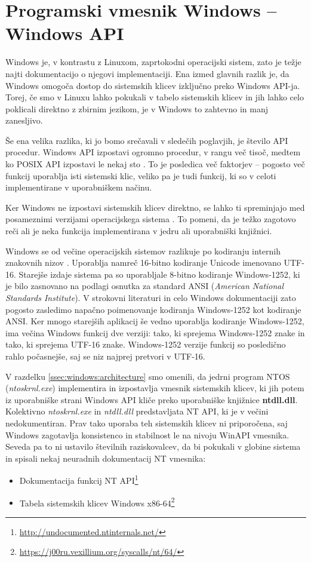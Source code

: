 \documentclass[a4paper,12pt,openright]{book}
\begin{document}
\section{Programski vmesnik Windows -- Windows API} \label{sec:windows_api}

Windows je, v kontrastu z Linuxom, zaprtokodni operacijski sistem, zato je težje najti dokumentacijo o njegovi implementaciji.
Ena izmed glavnih razlik je, da Windows omogoča dostop do sistemskih klicev izključno preko Windows API-ja.
Torej, če smo v Linuxu lahko pokukali v tabelo sistemskih klicev in jih lahko celo poklicali direktno z zbirnim jezikom, je v Windows to zahtevno in manj zanesljivo.

Še ena velika razlika, ki jo bomo srečavali v sledečih poglavjih, je število API procedur.
Windows API izpostavi ogromno procedur, v rangu več tisoč, medtem ko POSIX API izpostavi le nekaj sto \cite{Tanenbaum_Bos_2023}.
To je posledica več faktorjev -- pogosto več funkcij uporablja isti sistemski klic, veliko pa je tudi funkcij, ki so v celoti implementirane v uporabniškem načinu.

Ker Windows ne izpostavi sistemskih klicev direktno, se lahko ti spreminjajo med posameznimi verzijami operacijskega sistema \cite{Tanenbaum_Bos_2023}.
To pomeni, da je težko zagotovo reči ali je neka funkcija implementirana v jedru ali uporabniški knjižnici.

Windows se od večine operacijskih sistemov razlikuje po kodiranju internih znakovnih nizov \cite{Yosifovich_Russinovich_Solomon_Ionescu_2017}.
Uporablja namreč 16-bitno kodiranje Unicode imenovano UTF-16.
Starejše izdaje sistema pa so uporabljale 8-bitno kodiranje Windows-1252, ki je bilo zasnovano na podlagi osnutka za standard ANSI (\textit{American National Standards Institute}).
V strokovni literaturi in celo Windows dokumentaciji zato pogosto zasledimo napačno poimenovanje kodiranja Windows-1252 kot kodiranje ANSI.
Ker mnogo starejših aplikacij še vedno uporablja kodiranje Windows-1252, ima večina Windows funkcij dve verziji: tako, ki sprejema Windows-1252 znake in tako, ki sprejema UTF-16 znake.
Windows-1252 verzije funkcij so posledično rahlo počasnejše, saj se niz najprej pretvori v UTF-16.

V razdelku \ref{ssec:windows:architecture} smo omenili, da jedrni program NTOS (\textit{ntoskrnl.exe}) implementira in izpostavlja vmesnik sistemskih klicev, ki jih potem iz uporabniške strani Windows API kliče preko uporabniške knjižnice \textbf{ntdll.dll}.
Kolektivno \textit{ntoskrnl.exe} in \textit{ntdll.dll} predstavljata NT API, ki je v večini nedokumentiran.
Prav tako uporaba teh sistemskih klicev ni priporočena, saj Windows zagotavlja konsistenco in stabilnost le na nivoju WinAPI vmesnika.
Seveda pa to ni ustavilo številnih raziskovalcev, da bi pokukali v globine sistema in spisali nekaj neuradnih dokumentacij NT vmesnika:
\begin{itemize}
	\item Dokumentacija funkcij NT API\footnote{\url{http://undocumented.ntinternals.net/}}
	\item Tabela sistemskih klicev Windows x86-64\footnote{\url{https://j00ru.vexillium.org/syscalls/nt/64/}}
\end{itemize}
\end{document}

